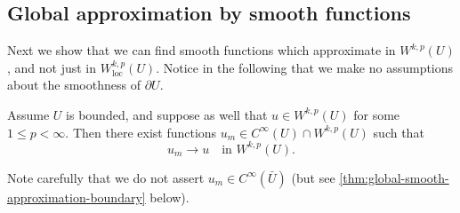 \subsection{Global approximation by smooth functions}

Next we show that we can find smooth functions which approximate in $W^{k,p}(U)$, and not just in $W^{k,p}_{\text{loc}}(U)$. Notice in the following that we make no assumptions about the smoothness of $\partial U$.

\begin{theorem}
\label{thm:global-smooth-approximation-interior}
Assume $U$ is bounded, and suppose as well that $u \in W^{k,p}(U)$ for some $1 \le p < \infty$. Then there exist functions $u_m \in C^\infty(U) \cap W^{k,p}(U)$ such that
$$u_m \to u \quad \text{in } W^{k,p}(U).$$
\end{theorem}

\begin{remark}
\label{rem:approximation-not-up-to-boundary}
Note carefully that we do not assert $u_m \in C^\infty(\bar U)$ (but see \cref{thm:global-smooth-approximation-boundary} below).
\end{remark}

